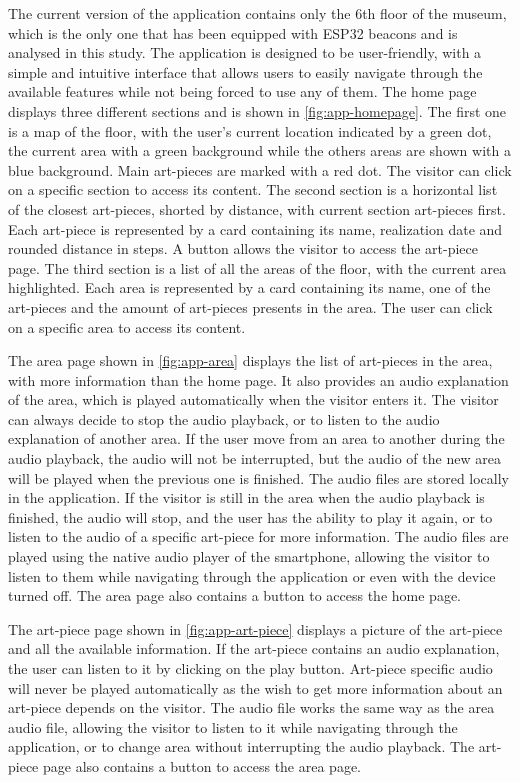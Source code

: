 The current version of the application contains only the 6th floor of the museum, which is the only one that has been equipped with ESP32 beacons and is analysed in this study. The application is designed to be user-friendly, with a simple and intuitive interface that allows users to easily navigate through the available features while not being forced to use any of them. The home page displays three different sections and is shown in \autoref{fig:app-homepage}. The first one is a map of the floor, with the user's current location indicated by a green dot, the current area with a green background while the others areas are shown with a blue background. Main art-pieces are marked with a red dot. The visitor can click on a specific section to access its content. The second section is a horizontal list of the closest art-pieces, shorted by distance, with current section art-pieces first. Each art-piece is represented by a card containing its name, realization date and rounded distance in steps. A button allows the visitor to access the art-piece page. The third section is a list of all the areas of the floor, with the current area highlighted. Each area is represented by a card containing its name, one of the art-pieces and the amount of art-pieces presents in the area. The user can click on a specific area to access its content. 

The area page shown in \autoref{fig:app-area} displays the list of art-pieces in the area, with more information than the home page. It also provides an audio explanation of the area, which is played automatically when the visitor enters it. The visitor can always decide to stop the audio playback, or to listen to the audio explanation of another area. If the user move from an area to another during the audio playback, the audio will not be interrupted, but the audio of the new area will be played when the previous one is finished. The audio files are stored locally in the application. If the visitor is still in the area when the audio playback is finished, the audio will stop, and the user has the ability to play it again, or to listen to the audio of a specific art-piece for more information. The audio files are played using the native audio player of the smartphone, allowing the visitor to listen to them while navigating through the application or even with the device turned off. The area page also contains a button to access the home page.

The art-piece page shown in \autoref{fig:app-art-piece} displays a picture of the art-piece and all the available information. If the art-piece contains an audio explanation, the user can listen to it by clicking on the play button. Art-piece specific audio will never be played automatically as the wish to get more information about an art-piece depends on the visitor. The audio file works the same way as the area audio file, allowing the visitor to listen to it while navigating through the application, or to change area without interrupting the audio playback. The art-piece page also contains a button to access the area page.

